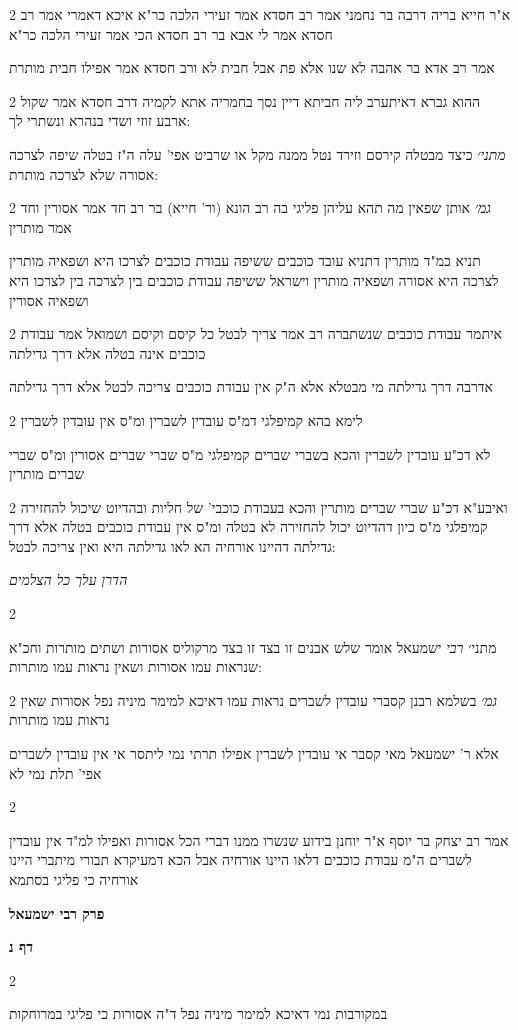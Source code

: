\documentclass[12pt, openany]{book}
\newcommand{\sethebfont}{
\fontsize{10.5pt}{21.0pt} \selectfont
}
\newcommand{\twocol}[1]{
	{\sethebfont \begin{multicols}{2}
			#1
	\end{multicols}}	
}
\newcommand{\chapname}{}
\newcommand{\sectname}{}
\newcommand{\newchap}[1]{
	\addcontentsline{toc}{chapter}{#1}
	\renewcommand{\chapname}{#1}
		\begin{center}
			\textbf{%
\fontsize{16pt}{16pt}\selectfont
				#1}
		\end{center}
}
\newcommand{\newsection}[1]{
	\addcontentsline{toc}{section}{#1}
	\renewcommand{\sectname}{#1}	
	\vspace{-\baselineskip}
	\begin{center}
		\textbf{%
\fontsize{16pt}{16pt}\selectfont
			#1}
	\end{center}
	\vspace{-\baselineskip}
	\nopagebreak
}
\begin{document}
\twocol{א"ר חייא בריה דרבה בר נחמני אמר רב חסדא אמר זעירי הלכה כר"א איכא דאמרי אמר רב חסדא אמר לי אבא בר רב חסדא הכי אמר זעירי הלכה כר"א
\par אמר רב אדא בר אהבה לא שנו אלא פת אבל חבית לא ורב חסדא אמר אפילו חבית מותרת}
\twocol{ההוא גברא דאיתערב ליה חביתא דיין נסך בחמריה אתא לקמיה דרב חסדא אמר שקול ארבע זוזי ושדי בנהרא ונשתרי לך:
\par {\large\emph{מתני׳}} כיצד מבטלה קירסם וזירד נטל ממנה מקל או שרביט אפי' עלה ה"ז בטלה שיפה לצרכה אסורה שלא לצרכה מותרת:}
\twocol{{\large\emph{גמ׳}} אותן שפאין מה תהא עליהן פליגי בה רב הונא (ור' חייא) בר רב חד אמר אסורין וחד אמר מותרין
\par תניא כמ"ד מותרין דתניא עובד כוכבים ששיפה עבודת כוכבים לצרכו היא ושפאיה מותרין לצרכה היא אסורה ושפאיה מותרין וישראל ששיפה עבודת כוכבים בין לצרכה בין לצרכו היא ושפאיה אסורין}
\twocol{איתמר עבודת כוכבים שנשתברה רב אמר צריך לבטל כל קיסם וקיסם ושמואל אמר עבודת כוכבים אינה בטלה אלא דרך גדילתה
\par אדרבה דרך גדילתה מי מבטלא אלא ה"ק אין עבודת כוכבים צריכה לבטל אלא דרך גדילתה}
\twocol{לימא בהא קמיפלגי דמ"ס עובדין לשברין ומ"ס אין עובדין לשברין
\par לא דכ"ע עובדין לשברין והכא בשברי שברים קמיפלגי מ"ס שברי שברים אסורין ומ"ס שברי שברים מותרין}
\twocol{ואיבע"א דכ"ע שברי שברים מותרין והכא בעבודת כוכבי' של חליות ובהדיוט שיכול להחזירה קמיפלגי מ"ס כיון דהדיוט יכול להחזירה לא בטלה ומ"ס אין עבודת כוכבים בטלה אלא דרך גדילתה דהיינו אורחיה הא לאו גדילתה היא ואין צריכה לבטל:
\par \par \par {\large\emph{הדרן עלך כל הצלמים}}\par \par }
\twocol{
\par מתני׳ {\large\emph{רבי}} ישמעאל אומר שלש אבנים זו בצד זו בצד מרקוליס אסורות ושתים מותרות וחכ"א שנראות עמו אסורות ושאין נראות עמו מותרות:}
\twocol{{\large\emph{גמ׳}} בשלמא רבנן קסברי עובדין לשברים נראות עמו דאיכא למימר מיניה נפל אסורות שאין נראות עמו מותרות
\par אלא ר' ישמעאל מאי קסבר אי עובדין לשברין אפילו תרתי נמי ליתסר אי אין עובדין לשברים אפי' תלת נמי לא}
\twocol{
\par אמר רב יצחק בר יוסף א"ר יוחנן בידוע שנשרו ממנו דברי הכל אסורות ואפילו למ"ד אין עובדין לשברים ה"מ עבודת כוכבים דלאו היינו אורחיה אבל הכא דמעיקרא תבורי מיתברי היינו אורחיה כי פליגי בסתמא}
\newchap{פרק \quad רבי ישמעאל}
\newsection{דף נ}
\twocol{
\par במקורבות נמי דאיכא למימר מיניה נפל ד"ה אסורות כי פליגי במרוחקות}
\end{document}
